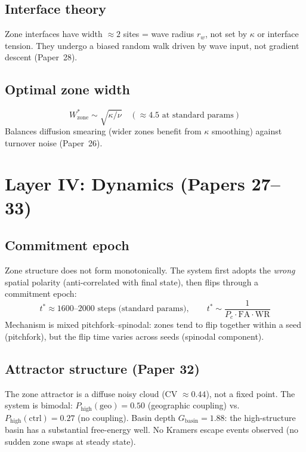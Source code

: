\documentclass[11pt]{article}
\begin{document}
\subsection{Interface theory}

Zone interfaces have width $\approx 2$ sites = wave radius $r_w$, not set by $\kappa$
or interface tension.
They undergo a biased random walk driven by wave input, not gradient descent (Paper~28).

\subsection{Optimal zone width}

\begin{equation}
W_\mathrm{zone}^* \sim \sqrt{\kappa/\nu} \quad (\approx 4.5 \text{ at standard params})
\end{equation}
Balances diffusion smearing (wider zones benefit from $\kappa$ smoothing) against
turnover noise (Paper~26).

\section{Layer IV: Dynamics (Papers 27--33)}

\subsection{Commitment epoch}

Zone structure does not form monotonically.
The system first adopts the \emph{wrong} spatial polarity (anti-correlated with final state),
then flips through a commitment epoch:
\begin{equation}
t^* \approx 1600\text{--}2000 \text{ steps (standard params)}, \qquad
t^* \sim \frac{1}{P_c \cdot \mathrm{FA} \cdot \mathrm{WR}}
\end{equation}
Mechanism is mixed pitchfork--spinodal: zones tend to flip together within a seed
(pitchfork), but the flip time varies across seeds (spinodal component).

\subsection{Attractor structure (Paper 32)}

The zone attractor is a diffuse noisy cloud (CV $\approx 0.44$), not a fixed point.
The system is bimodal: $P_\mathrm{high}(\mathrm{geo}) = 0.50$ (geographic coupling) vs.\
$P_\mathrm{high}(\mathrm{ctrl}) = 0.27$ (no coupling).
Basin depth $G_\mathrm{basin} = 1.88$: the high-structure basin has a substantial
free-energy well.
No Kramers escape events observed (no sudden zone swaps at steady state).
\end{document}
